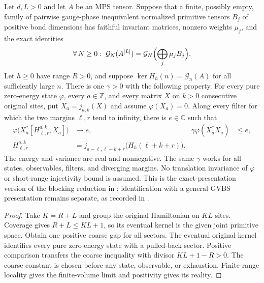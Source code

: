 \begin{lemma}
    \label{thm:blocked_primitive_quasi_local_gap}
    \leanok
    Let $d,L>0$ and let $A$ be an MPS tensor. Suppose that a finite,
    possibly empty, family of pairwise gauge-phase inequivalent normalized
    primitive tensors $B_j$ of positive bond dimensions has faithful invariant
    matrices, nonzero weights $\mu_j$, and the exact identities
    \begin{align}
        \forall\,N\geq0:\ \mathcal G_N(A^{[L]})
        =\mathcal G_N\Bigl(\bigoplus_j\mu_jB_j\Bigr).
        \notag
    \end{align}
    Let $h\geq0$ have range $R>0$, and suppose
    $\ker H_h(n)=\mathcal G_n(A)$ for all sufficiently large $n$.
    There is one $\gamma>0$ with the following property. For every pure
    zero-energy state $\varphi$, every $a\in\mathbb Z$, and every matrix $X$
    on $k>0$ consecutive original sites, put $X_a=j_{a,k}(X)$ and assume
    $\varphi(X_a)=0$. Along every filter for which the two margins
    $\ell,r$ tend to infinity, there is $e\in\mathbb C$ such that
    \begin{align}
        \varphi\bigl(X_a^*[H_{\ell,r}^{a,k},X_a]\bigr) & \longrightarrow e,
                                                       &
        \gamma\varphi(X_a^*X_a)                        & \leq e,
        \label{eq:blocked_primitive_literal_gap}                                                        \\
        H_{\ell,r}^{a,k}
                                                       & =j_{a-\ell,\ell+k+r}\bigl(H_h(\ell+k+r)\bigr).
        \nonumber
    \end{align}
    The energy and variance are real and nonnegative. The same $\gamma$
    works for all states, observables, filters, and diverging margins.
    No translation invariance of $\varphi$ or short-range injectivity
    bound is assumed. This is the exact-presentation version of the
    blocking reduction in \cite[Theorem~1.2 and Section~6]{Nachtergaele1996Spectral};
    identification with a general GVBS presentation remains separate,
    as recorded in \cite{gap:nachtergaele96_infinite_volume_ground_projection}.
\end{lemma}
\begin{proof}\leanok
    Take $K=R+L$ and group the original Hamiltonian on $KL$ sites.
    Coverage gives $R+L\leq KL+1$, so its eventual kernel is the given
    joint primitive space. Obtain one positive coarse gap for all sectors.
    The eventual original kernel identifies every pure zero-energy state
    with a pulled-back sector. Positive comparison transfers the coarse
    inequality with divisor $KL+1-R>0$. The coarse constant is chosen
    before any state, observable, or exhaustion. Finite-range locality
    gives the finite-volume limit and positivity gives its reality.
\end{proof}

